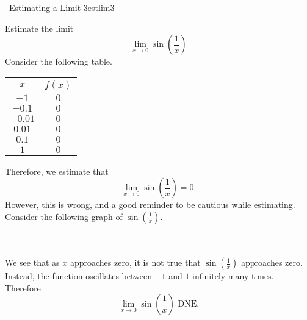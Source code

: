         \begin{example}{\Difficulty\,\Difficulty\,\,Estimating a Limit 3}{estlim3}
            
            Estimate the limit
            \begin{equation*}
                \lim_{x\to 0}\sin\left(\frac{1}{x}\right)
            \end{equation*}
            Consider the following table.
            \begin{center}
                \begin{tabular}{|cc|}
                    \hline
                    \(x\) & \(f(x)\) \\
                    \hline
                    \(-1\) & \(0\) \\
                    \(-0.1\) & \(0\) \\
                    \(-0.01\) & \(0\) \\
                    \(0.01\) & \(0\) \\
                    \(0.1\) & \(0\) \\
                    \(1\) & \(0\) \\
                    \hline
                \end{tabular}
            \end{center}
            Therefore, we estimate that 
            \begin{equation*}
                \lim_{x\to 0}\sin\left(\frac{1}{x}\right)=0.
            \end{equation*}
            However, this is wrong, and a good reminder to be cautious while estimating. Consider the following graph of \(\sin\left(\frac{1}{x}\right)\).
            \begin{center}
            \end{center}
            \vphantom
            \\
            \\
            We see that as \(x\) approaches zero, it is not true that \(\sin\left(\frac{1}{x}\right)\) approaches zero. Instead, the function oscillates between \(-1\) and \(1\) infinitely many times. Therefore
            \begin{equation*}
                \lim_{x\to 0}\sin\left(\frac{1}{x}\right)\text{ DNE}.
            \end{equation*}

        \end{example}
